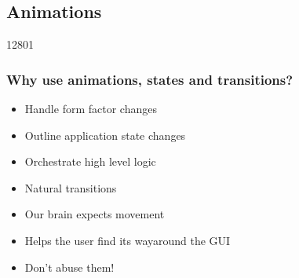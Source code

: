 %
%
%
%

\subsection{Animations}
\begin{slide}{12801}\frametitle{Why use animations, states and transitions?}
\label{animations-showcase}

\begin{itemize}
\item Handle form factor changes
\item Outline application state changes
\item Orchestrate high level logic
\item Natural transitions
\item Our brain expects movement
\item Helps the user find its way\linebreak around the GUI
\item Don't abuse them!
\end{itemize}

\vspace*{2em}
\end{slide}


